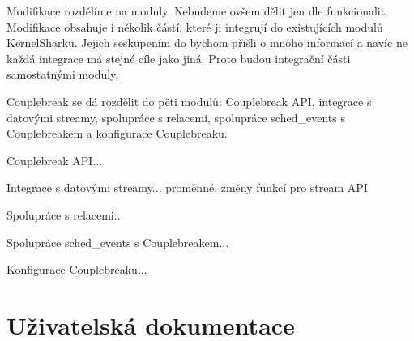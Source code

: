 Modifikace rozdělíme na moduly. Nebudeme ovšem dělit jen dle funkcionalit. Modifikace obsahuje i několik částí, které ji integrují do existujících modulů KernelSharku. Jejich seskupením do  bychom přišli o mnoho informací a navíc ne každá integrace má stejné cíle jako jiná. Proto budou integrační části samostatnými moduly.

Couplebreak se dá rozdělit do pěti modulů: Couplebreak API, integrace s datovými streamy, spolupráce s relacemi, spolupráce sched\_events s Couplebreakem a konfigurace Couplebreaku. 

Couplebreak API...

Integrace s datovými streamy... proměnné, změny funkcí pro stream API

Spolupráce s relacemi...

Spolupráce sched\_events s Couplebreakem...

Konfigurace Couplebreaku...

\section{Uživatelská dokumentace}

